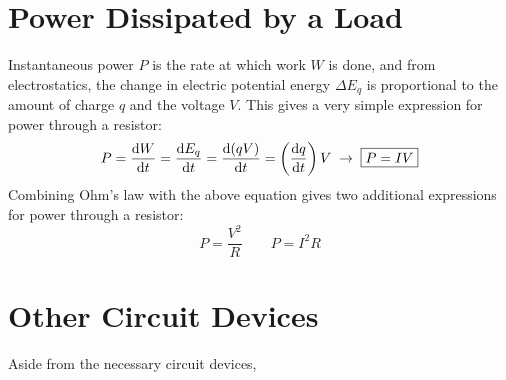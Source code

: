 \section{Power Dissipated by a Load}
Instantaneous power $P$ is the rate at which work $W$ is done, and from
electrostatics, the change in electric potential energy $\Delta E_q$ is
proportional to the amount of charge $q$ and the voltage $V$. This gives a very
simple expression for power through a resistor:  
\begin{equation}
  P=\diff Wt=\diff {E_q}t=\diff{(qV)}t=\left(\diff qt\right)V
  \;\rightarrow\;\boxed{P=IV}
\end{equation}
Combining Ohm's law with the above equation gives two additional expressions
for power through a resistor:
\begin{equation}
  \boxed{
    P=\frac{V^2}R
  }\quad\quad
  \boxed{
    P=I^2R
  }
\end{equation}



\section{Other Circuit Devices}

Aside from the necessary circuit devices,

